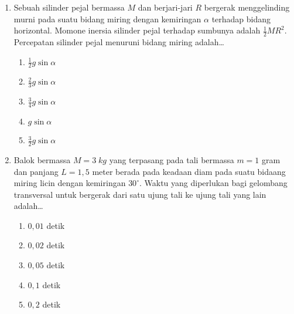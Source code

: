 \documentclass[A4,12PT, english, twocolumn]{journal}
\begin{document}
\begin{enumerate}
\item Sebuah silinder pejal bermassa $M$ dan berjari-jari $R$ bergerak menggelinding murni pada suatu bidang miring dengan kemiringan $\alpha$ terhadap bidang horizontal. Momone inersia silinder pejal terhadap sumbunya adalah $\frac{1}{2}MR^2$. Percepatan silinder pejal menuruni bidang miring adalah\dots
    \begin{enumerate}
        \item $\frac{1}{2}g \sin{\alpha}$
        \item $\frac{2}{3}g \sin{\alpha}$
        \item $\frac{3}{4}g \sin{\alpha}$
        \item $g \sin{\alpha}$
        \item $\frac{3}{2}g \sin{\alpha}$
    \end{enumerate}
    
\item Balok bermassa $M = 3 \; kg$ yang terpasang pada tali bermassa $m = 1$ gram dan panjang $L = 1,5$ meter berada pada keadaan diam pada suatu bidaang miring licin dengan kemiringan $30^\circ$. Waktu yang diperlukan bagi gelombang transversal untuk bergerak dari satu ujung tali ke ujung tali yang lain adalah\dots
\begin{center}
\end{center}
    \begin{enumerate}
        \item $0,01$ detik
        \item $0,02$ detik
        \item $0,05$ detik
        \item $0,1$ detik
        \item $0,2$ detik
    \end{enumerate}


\end{enumerate}
\end{document}
